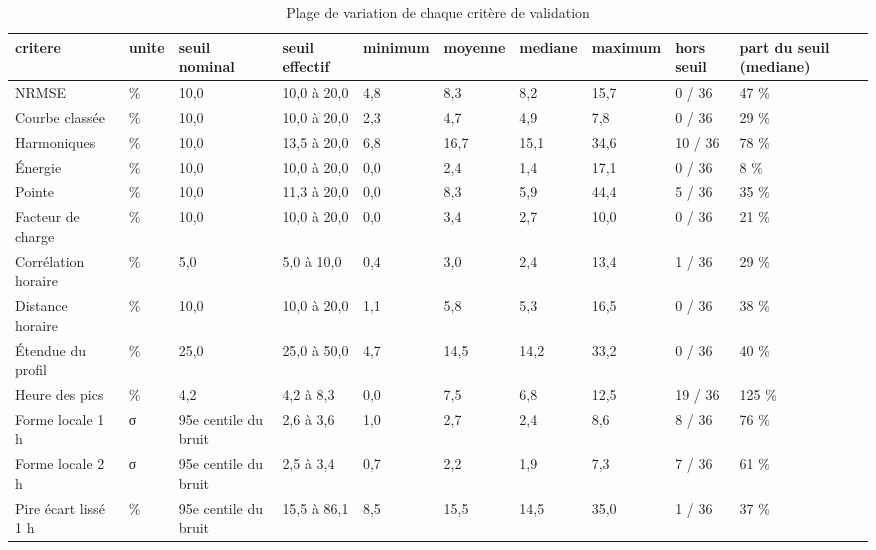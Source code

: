 \begin{table}[htbp]
\caption{Plage de variation de chaque critère de validation}
\label{tab:plages_criteres}
\begin{tabular}{llllllllll}
\toprule
critere & unite & seuil nominal & seuil effectif & minimum & moyenne & mediane & maximum & hors seuil & part du seuil (mediane) \\
\midrule
NRMSE & \% & 10,0 & 10,0 à 20,0 & 4,8 & 8,3 & 8,2 & 15,7 & 0 / 36 & 47 \% \\
Courbe classée & \% & 10,0 & 10,0 à 20,0 & 2,3 & 4,7 & 4,9 & 7,8 & 0 / 36 & 29 \% \\
Harmoniques & \% & 10,0 & 13,5 à 20,0 & 6,8 & 16,7 & 15,1 & 34,6 & 10 / 36 & 78 \% \\
Énergie & \% & 10,0 & 10,0 à 20,0 & 0,0 & 2,4 & 1,4 & 17,1 & 0 / 36 & 8 \% \\
Pointe & \% & 10,0 & 11,3 à 20,0 & 0,0 & 8,3 & 5,9 & 44,4 & 5 / 36 & 35 \% \\
Facteur de charge & \% & 10,0 & 10,0 à 20,0 & 0,0 & 3,4 & 2,7 & 10,0 & 0 / 36 & 21 \% \\
Corrélation horaire & \% & 5,0 & 5,0 à 10,0 & 0,4 & 3,0 & 2,4 & 13,4 & 1 / 36 & 29 \% \\
Distance horaire & \% & 10,0 & 10,0 à 20,0 & 1,1 & 5,8 & 5,3 & 16,5 & 0 / 36 & 38 \% \\
Étendue du profil & \% & 25,0 & 25,0 à 50,0 & 4,7 & 14,5 & 14,2 & 33,2 & 0 / 36 & 40 \% \\
Heure des pics & \% & 4,2 & 4,2 à 8,3 & 0,0 & 7,5 & 6,8 & 12,5 & 19 / 36 & 125 \% \\
Forme locale 1 h & σ & 95e centile du bruit & 2,6 à 3,6 & 1,0 & 2,7 & 2,4 & 8,6 & 8 / 36 & 76 \% \\
Forme locale 2 h & σ & 95e centile du bruit & 2,5 à 3,4 & 0,7 & 2,2 & 1,9 & 7,3 & 7 / 36 & 61 \% \\
Pire écart lissé 1 h & \% & 95e centile du bruit & 15,5 à 86,1 & 8,5 & 15,5 & 14,5 & 35,0 & 1 / 36 & 37 \% \\
\bottomrule
\end{tabular}
\end{table}
